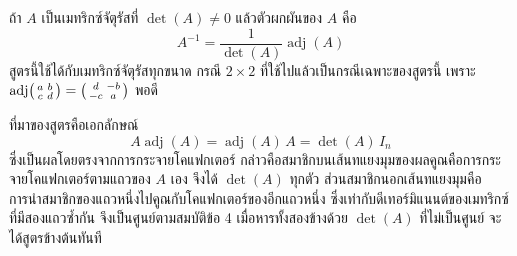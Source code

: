 \begin{prop}
\label{prop:inverse-adjugate}
ถ้า $A$ เป็นเมทริกซ์จัตุรัสที่ $\det(A) \neq 0$ แล้วตัวผกผันของ $A$ คือ
\[ A^{-1} = \frac{1}{\det(A)}\operatorname{adj}(A) \]
สูตรนี้ใช้ได้กับเมทริกซ์จัตุรัสทุกขนาด กรณี $2 \times 2$ ที่ใช้ไปแล้วเป็นกรณีเฉพาะของสูตรนี้ เพราะ $\operatorname{adj}\begin{psmallmatrix} a & b \\ c & d \end{psmallmatrix} = \begin{psmallmatrix} d & -b \\ -c & a \end{psmallmatrix}$ พอดี

ที่มาของสูตรคือเอกลักษณ์
\[ A \operatorname{adj}(A) = \operatorname{adj}(A)\, A = \det(A)\, I_n \]
ซึ่งเป็นผลโดยตรงจากการกระจายโคแฟกเตอร์ กล่าวคือสมาชิกบนเส้นทแยงมุมของผลคูณคือการกระจายโคแฟกเตอร์ตามแถวของ $A$ เอง จึงได้ $\det(A)$ ทุกตัว ส่วนสมาชิกนอกเส้นทแยงมุมคือการนำสมาชิกของแถวหนึ่งไปคูณกับโคแฟกเตอร์ของอีกแถวหนึ่ง ซึ่งเท่ากับดีเทอร์มิแนนต์ของเมทริกซ์ที่มีสองแถวซ้ำกัน จึงเป็นศูนย์ตามสมบัติข้อ 4 เมื่อหารทั้งสองข้างด้วย $\det(A)$ ที่ไม่เป็นศูนย์ จะได้สูตรข้างต้นทันที
\end{prop}

